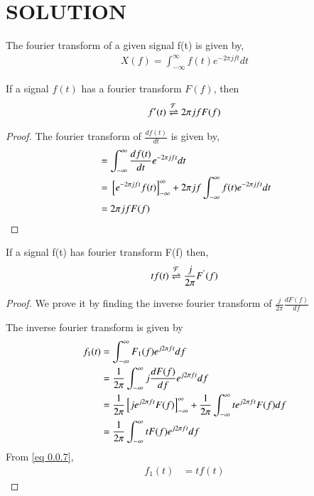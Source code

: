 \documentclass[journal,12pt,twocolumn]{IEEEtran}
\begin{document}
\section*{SOLUTION}
 The fourier transform of a given signal f(t) is given by,
        \begin{align}
            X(f) = \int_{-\infty}^{\infty} f(t) e^{-2\pi jft} dt
        \end{align}
\begin{lemma}
If a signal $f(t)$ has a fourier transform $F(f)$, then
\begin{align}
    f'(t) \overset{\mathcal{F}}{ \rightleftharpoons} 2\pi jfF(f) 
\end{align}\label{lemma 1}
\end{lemma}
\begin{proof}
 The fourier transform of $\frac{d f(t)}{dt}$ is given by,
        \begin{align}
            &= \int_{-\infty}^{\infty}  \frac{df(t)}{dt} e^{-2\pi jft} dt\\
            &= {}\left[e^{-2\pi jft} f(t)\right]_{-\infty}^{\infty} + 2\pi jf\int_{-\infty}^{\infty} f(t) e^{-2\pi jft} dt\\
            &= 2\pi jfF(f)
        \end{align}
\end{proof}
\begin{lemma}
If a signal f(t) has fourier transform F(f) then,
\begin{align}
    tf(t) \overset{\mathcal{F}}{ \rightleftharpoons} \frac{j}{2\pi}F^{'}(f) 
\end{align} \label{lemma 2}
\end{lemma}
\begin{proof}
 We prove it by finding the inverse fourier transform of $\frac{j}{2\pi}\frac{dF(f)}{df}$
        
        The inverse fourier transform is given by
        \begin{align}
            f_1(t) &= \int_{-\infty}^{\infty} F_1(f)e^{j2\pi ft} df\\\label{eq 0.0.7}
            &= \frac{1}{2\pi} \int_{-\infty}^{\infty} j\frac{dF(f)}{df}
            e^{j2\pi ft} df\\
            &= \frac{1}{2\pi} {}\left[je^{j2\pi ft} F(f)\right]_{-\infty}^{\infty} + \frac{1}{2\pi} \int_{-\infty}^{\infty} te^{j2\pi ft} F(f) df \\
            &= \frac{1}{2\pi} \int_{-\infty}^{\infty} t F(f) e^{j2\pi ft} df 
        \end{align}
        From \eqref{eq 0.0.7}, 
        \begin{align}
            f_1(t) &= tf(t)
        \end{align}
\end{proof}
\end{document}
